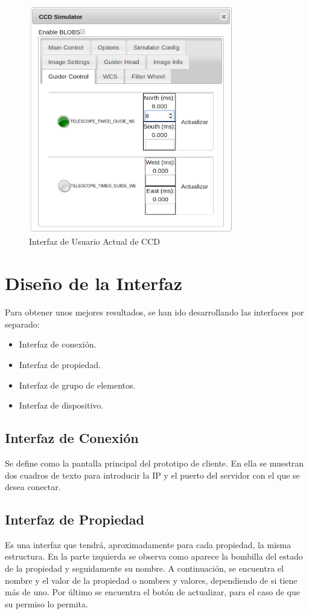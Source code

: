 \begin{figure}[htb]
\centering
\includegraphics[width=0.8\textwidth]{./imagenes/interfazActual}
\caption{Interfaz de Usuario Actual de CCD} \label{fig:interfazActual}
\end{figure}

\section{Diseño de la Interfaz}
Para obtener unos mejores resultados, se han ido desarrollando las interfaces por separado:
\begin{itemize}
  \item Interfaz de conexión.
  \item Interfaz de propiedad.
  \item Interfaz de grupo de elementos.
  \item Interfaz de dispositivo.
\end{itemize}

\subsection{Interfaz de Conexión}
Se define como la pantalla principal del prototipo de cliente. En ella se muestran dos cuadros de texto para introducir la IP y el puerto del servidor con el que se desea conectar.

\subsection{Interfaz de Propiedad}
Es una interfaz que tendrá, aproximadamente para cada propiedad, la misma estructura.
En la parte izquierda se observa como aparece la bombilla del estado de la propiedad y seguidamente su nombre. A continuación, se encuentra el nombre y el valor de la propiedad o nombres y valores, dependiendo de si tiene más de uno. Por último se encuentra el botón de actualizar, para el caso de que su permiso lo permita.\\

